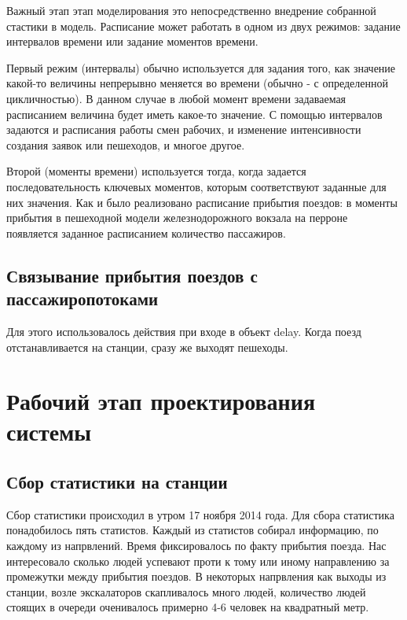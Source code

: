 \documentclass[12pt]{article}
\begin{document}
Важный этап этап моделирования это непосредственно внедрение собранной стастики в модель. Расписание может работать в одном из двух режимов: задание интервалов времени или задание моментов времени.

Первый режим (интервалы) обычно используется для задания того, как значение какой-то величины непрерывно меняется во времени (обычно - с определенной цикличностью). В данном случае в любой момент времени задаваемая расписанием величина будет иметь какое-то значение. С помощью интервалов задаются и расписания работы смен рабочих, и изменение интенсивности создания заявок или пешеходов, и многое другое.

Второй (моменты времени) используется тогда, когда задается последовательность ключевых моментов, которым соответствуют заданные для них значения. Как и было реализовано расписание прибытия поездов: в моменты прибытия в пешеходной модели железнодорожного вокзала на перроне появляется заданное расписанием количество пассажиров. 
		\subsection{Связывание прибытия поездов с пассажиропотоками}
Для этого использовалось действия при входе в объект delay. Когда поезд отстанавливается на станции, сразу же выходят пешеходы. 		
\newpage
\section{Рабочий этап проектирования системы}
		\subsection{Сбор статистики на станции}
		
		Сбор статистики происходил в утром 17 ноября 2014 года. Для сбора статистика понадобилось пять статистов. Каждый из статистов собирал информацию, по каждому из напрвлений. Время фиксировалось по факту прибытия поезда.  Нас интересовало сколько людей успевают проти к тому или иному направлению за промежутки между прибытия поездов. В некоторых напрвления как выходы из станции, возле экскалаторов скапливалось много людей, количество людей стоящих в очереди оченивалось примерно 4-6 человек на квадратный метр.
		
\end{document}
